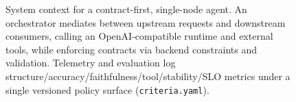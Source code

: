 \documentclass[11pt]{article}
\begin{document}
\begin{figure}[t]
\caption{System context for a contract-first, single-node agent.
An orchestrator mediates between upstream requests and downstream consumers, calling an OpenAI-compatible runtime and external tools, while enforcing contracts via backend constraints and validation.
Telemetry and evaluation log structure/accuracy/faithfulness/tool/stability/SLO metrics under a single versioned policy surface (\texttt{criteria.yaml}).}
\label{fig:agent-context}
\end{figure}
\end{document}

